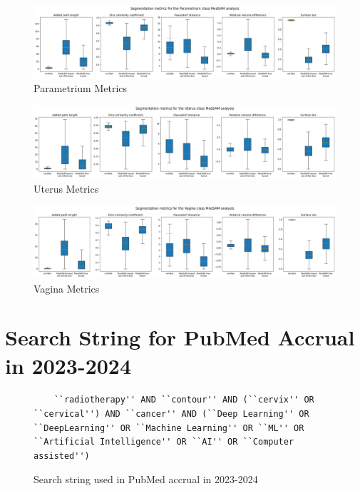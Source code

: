 \documentclass[11pt,twoside]{report}
\begin{document}
\begin{landscape}
  \begin{figure}[H]
    \centering
    \includegraphics[width=\linewidth]{../../research/source/code/data/metrics/metricsparametrium_1_combinednotable_MedSAM_analysis.png}
    \caption{Parametrium Metrics}\label{fig:medsam-metrics-parametrium}
  \end{figure}

  \begin{figure}[H]
    \centering
    \includegraphics[width=\linewidth]{../../research/source/code/data/metrics/metricsuterus_1_combinednotable_MedSAM_analysis.png}
    \caption{Uterus Metrics}\label{fig:medsam-metrics-uterus}
  \end{figure}

  \begin{figure}[H]
    \centering
    \includegraphics[width=\linewidth]{../../research/source/code/data/metrics/metricsvagina_1_combinednotable_MedSAM_analysis.png}
    \caption{Vagina Metrics}\label{fig:medsam-metrics-vagina}
  \end{figure}

\end{landscape}

\section{Search String for PubMed Accrual in 2023-2024}

\begin{figure}[H]
  \begin{lstlisting}
    ``radiotherapy'' AND ``contour'' AND (``cervix'' OR ``cervical'') AND ``cancer'' AND (``Deep Learning'' OR ``DeepLearning'' OR ``Machine Learning'' OR ``ML'' OR ``Artificial Intelligence'' OR ``AI'' OR ``Computer assisted'')  
   \end{lstlisting}
   \caption{Search string used in PubMed accrual in 2023-2024}\label{fig:pubmed-search-string}  
\end{figure}
\end{document}

